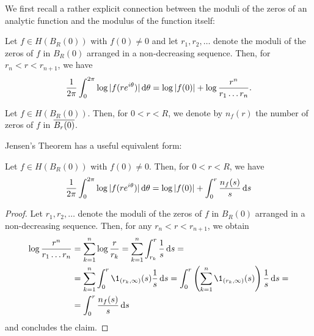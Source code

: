 We first recall a rather explicit connection between the moduli of the zeros of an analytic function and the modulus of the function itself:

\begin{theorem} \label{thm:jensen}
    Let $f \in H(B_R(0))$ with $f(0) \neq 0$ and let $r_1, r_2, \hdots$ denote the moduli of the zeros of $f$ in $B_{R}(0)$ arranged in a non-decreasing sequence. Then, for $r_n < r < r_{n+1}$, we have
    \begin{equation}
        \frac{1}{2 \pi} \int_0^{2\pi} \log \vert f(r e^{i \theta}) \vert \mathop{}\!\mathrm{d} \theta = \log \vert f(0) \vert + \log \frac{r^n}{r_1 \hdots r_n}.
    \end{equation}
\end{theorem}

\begin{definition}
    Let $f \in H(B_R(0))$. Then, for $0 < r < R$, we denote by $n_f(r)$ the number of zeros of $f$ in $\overline{B_{r}(0)}$.
\end{definition}

Jensen's Theorem has a useful equivalent form:

\begin{corollary} \label{cor:jensen-nf}
    Let $f \in H(B_R(0))$ with $f(0) \neq 0$. Then, for $0 < r < R$, we have
    \begin{equation}
        \frac{1}{2 \pi} \int_0^{2\pi} \log \vert f(re^{i \theta}) \vert \mathop{}\!\mathrm{d} \theta = \log \vert f(0) \vert + \int_0^r \frac{n_f(s)}{s} \mathop{}\!\mathrm{d} s
    \end{equation}
\end{corollary}

\begin{proof}
    Let $r_1, r_2, \hdots$ denote the moduli of the zeros of $f$ in $B_{R}(0)$ arranged in a non-decreasing sequence. Then, for any $r_n < r < r_{n+1}$, we obtain
    \begin{align*}
        \log \frac{r^n}{r_1 \hdots r_n} &= \sum_{k=1}^n \log \frac{r}{r_k} = \sum_{k=1}^n \int_{r_k}^r \frac{1}{s} \diff s = \\
        &= \sum_{k=1}^n \int_0^r \1_{(r_k, \infty)}(s) \frac{1}{s} \diff s = \int_0^r \left( \sum_{k=1}^n \1_{(r_k, \infty)}(s) \right) \frac{1}{s} \diff s = \\
        &= \int_0^r \frac{n_f(s)}{s} \diff s
    \end{align*}
    and  concludes the claim.
\end{proof}

